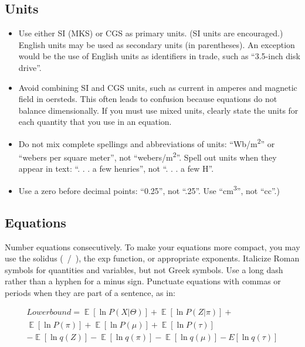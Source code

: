 \documentclass[conference]{IEEEtran}
\begin{document}
\subsection{Units}
\begin{itemize}
\item Use either SI (MKS) or CGS as primary units. (SI units are encouraged.) English units may be used as secondary units (in parentheses). An exception would be the use of English units as identifiers in trade, such as ``3.5-inch disk drive''.
\item Avoid combining SI and CGS units, such as current in amperes and magnetic field in oersteds. This often leads to confusion because equations do not balance dimensionally. If you must use mixed units, clearly state the units for each quantity that you use in an equation.
\item Do not mix complete spellings and abbreviations of units: ``Wb/m\textsuperscript{2}'' or ``webers per square meter'', not ``webers/m\textsuperscript{2}''. Spell out units when they appear in text: ``. . . a few henries'', not ``. . . a few H''.
\item Use a zero before decimal points: ``0.25'', not ``.25''. Use ``cm\textsuperscript{3}'', not ``cc''.)
\end{itemize}

\subsection{Equations}
Number equations consecutively. To make your 
equations more compact, you may use the solidus (~/~), the exp function, or 
appropriate exponents. Italicize Roman symbols for quantities and variables, 
but not Greek symbols. Use a long dash rather than a hyphen for a minus 
sign. Punctuate equations with commas or periods when they are part of a 
sentence, as in:

\begin{equation}
\begin{split}
Lowerbound = \mathop{\mathbb{E}}[\ln P(X|\Theta)] + \mathop{\mathbb{E}}[\ln P(Z|\pi)] +\\
\mathop{\mathbb{E}}[\ln P(\pi)]+ \mathop{\mathbb{E}}[\ln P(\mu)]+\mathop{\mathbb{E}}[\ln P(\tau)] \\
-\mathop{\mathbb{E}}[\ln q(Z)]-\mathop{\mathbb{E}}[\ln q(\pi)]-\mathop{\mathbb{E}}[\ln q(\mu)]-E[\ln q(\tau)]
\end{split}
\label{eq}
\end{equation}
\end{document}
